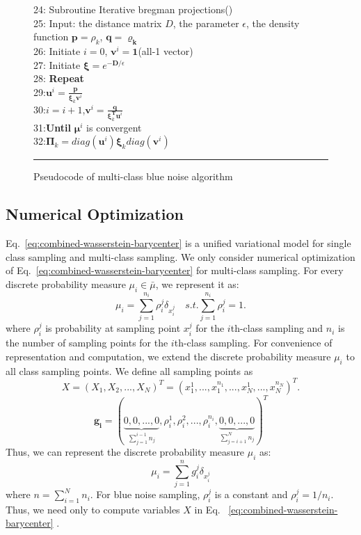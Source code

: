 \begin{figure}[htb]
24: Subroutine Iterative bregman projections()\\
25: Input: the distance matrix $D$, the parameter $\epsilon$,
    the density function $\mathbf{p}=\rho_k$,
    $\mathbf{q}=\mathbf{\varrho_{k}}$\\
26: Initiate $i=0$, $\mathbf{v}^i=\mathbf{1}$(all-1 vector)\\
27: Initiate $\mathbf\xi=e^{-\mathbf{D}/\epsilon}$\\
28: \textbf{Repeat}\\
29:\quad $\mathbf{u}^i=\frac{\mathbf{p}}{\mathbf{\xi}_k\mathbf{v}^i}$\\
30:\quad $i=i+1$,$\mathbf{v}^i=\frac{\mathbf{q}}{\mathbf{\xi}_k^\mathbf{T}\mathbf{u}^i}$\\
31:\textbf{Until} $\mathbf{\mu}^i$ is convergent\\
32:$\mathbf{\Pi}_k=diag(\mathbf{u}^i)\mathbf{\xi}_k diag({\mathbf{v}^i})$\\
   \rule{0.47\textwidth}{0.5pt}
  \caption{Pseudocode of multi-class blue noise algorithm}\label{fig:pseudocode}
\end{figure}


\subsection{Numerical Optimization}
Eq.~\ref{eq:combined-wasserstein-barycenter} is a unified variational model for single class sampling and multi-class sampling.
We only consider numerical optimization of Eq.~\ref{eq:combined-wasserstein-barycenter}
for multi-class sampling.
For every discrete probability measure $\mu_i\in\bar\mu$,
we represent it as:
\begin{equation}
 \mu_i=\sum\limits_{j=1}^{n_i}\rho_i^j\delta_{x_i^j} \quad s.t. \sum\limits_{j=1}^{n_i}\rho_i^j=1.
\end{equation}
where $\rho_i^j$ is probability at sampling point $x_i^j$ for the $i$th-class sampling
and $n_i$ is the number of sampling points for the $i$th-class sampling.
For convenience of representation and computation,
we extend the discrete probability measure $\mu_i$ to all class sampling points.
We define all sampling points as
\begin{equation}
 X=(X_1,X_2,...,X_N)^T=(x_1^1,...,x_1^{n_1},...,x_N^1,...,x_N^{n_N})^T.
\end{equation}
\begin{equation}
\mathbf{g_i}=(\underbrace{0,0,...,0}_{\sum\limits_{j=1}^{i-1}n_j},\rho_i^1,\rho_i^2,...,\rho_i^{n_i},\underbrace{0,0,...,0}_{\sum\limits_{j=i+1}^{N}n_j})^T
\end{equation}
Thus,
we can represent the discrete probability measure $\mu_i$ as:
\begin{equation}
  \mu_i=\sum\limits_{j=1}^{n}g_i^j\delta_{x_i^j}
\end{equation}
where $n=\sum\limits_{i=1}^N{n_i}$.
For blue noise sampling,
$\rho_i^j$ is a constant and $\rho_i^j=1/n_i$.
Thus, we need only to compute variables $X$ in Eq. ~\ref{eq:combined-wasserstein-barycenter} .

